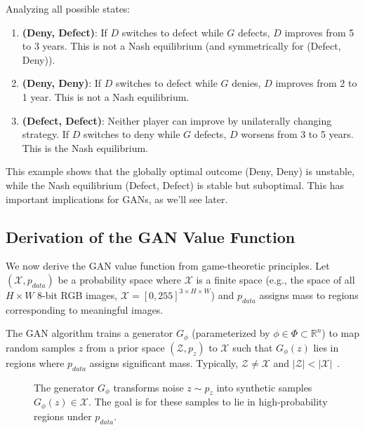Analyzing all possible states:
\begin{enumerate}
  \item \textbf{(Deny, Defect)}: If $D$ switches to defect while $G$ defects, $D$ improves from 5 to 3 years. This is not a Nash equilibrium (and symmetrically for (Defect, Deny)).
  
  \item \textbf{(Deny, Deny)}: If $D$ switches to defect while $G$ denies, $D$ improves from 2 to 1 year. This is not a Nash equilibrium.
  
  \item \textbf{(Defect, Defect)}: Neither player can improve by unilaterally changing strategy. If $D$ switches to deny while $G$ defects, $D$ worsens from 3 to 5 years. This is the Nash equilibrium.
\end{enumerate}

This example shows that the globally optimal outcome (Deny, Deny) is unstable, while the Nash equilibrium (Defect, Defect) is stable but suboptimal. This has important implications for GANs, as we'll see later.

\subsection{Derivation of the GAN Value Function}%
\label{sec:derivation}

We now derive the GAN value function from game-theoretic principles. Let $(\mathcal{X}, p_{data})$ be a probability space where $\mathcal{X}$ is a finite space (e.g., the space of all $H \times W$ 8-bit RGB images, $\mathcal{X} = [0, 255]^{3 \times H \times W}$) and $p_{data}$ assigns mass to regions corresponding to meaningful images.

The GAN algorithm trains a generator $G_\phi$ (parameterized by $\phi \in \Phi \subset \mathbb{R}^n$) to map random samples $z$ from a prior space $(\mathcal{Z}, p_z)$ to $\mathcal{X}$ such that $G_\phi(z)$ lies in regions where $p_{data}$ assigns significant mass. Typically, $\mathcal{Z} \neq \mathcal{X}$ and $|\mathcal{Z}| < |\mathcal{X}|$~\cite{ref:arjovsky-2017}.

\begin{figure}[H]
  \centering
  \caption{The generator $G_\phi$ transforms noise $z \sim p_z$ into synthetic samples $G_\phi(z) \in \mathcal{X}$. The goal is for these samples to lie in high-probability regions under $p_{data}$.}%
  \label{fig:g-maps}
\end{figure}

